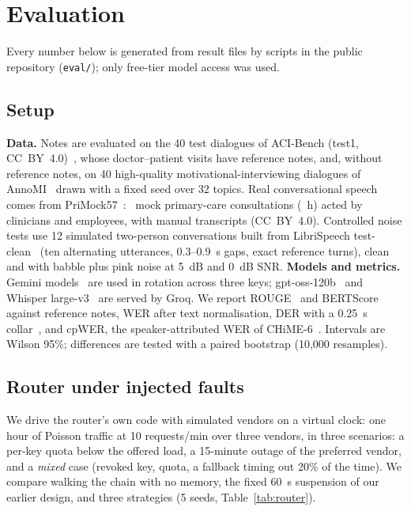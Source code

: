 \section{Evaluation}\label{sec:eval}
Every number below is generated from result files by scripts in the public repository (\texttt{eval/}); only free-tier model access was used.

\subsection{Setup}
\textbf{Data.} Notes are evaluated on the 40 test dialogues of ACI-Bench (test1, CC~BY~4.0)~\cite{yim2023aci}, whose doctor--patient visits have reference notes, and, without reference notes, on 40 high-quality motivational-interviewing dialogues of AnnoMI~\cite{wu2022annomi} drawn with a fixed seed over 32 topics. Real conversational speech comes from PriMock57~\cite{korfiatis2022primock57}: \ResPmN\ mock primary-care consultations (\ResPmHours~h) acted by clinicians and employees, with manual transcripts (CC~BY~4.0). Controlled noise tests use 12 simulated two-person conversations built from LibriSpeech test-clean~\cite{panayotov2015librispeech} (ten alternating utterances, 0.3--0.9~s gaps, exact reference turns), clean and with babble plus pink noise at 5~dB and 0~dB SNR.
\textbf{Models and metrics.} Gemini models~\cite{gemini2023} are used in rotation across three keys; gpt-oss-120b~\cite{openai2025gptoss} and Whisper large-v3~\cite{radford2023whisper} are served by Groq. We report ROUGE~\cite{lin2004rouge} and BERTScore~\cite{zhang2020bertscore} against reference notes, WER after text normalisation, DER with a 0.25~s collar~\cite{bredin2017metrics}, and cpWER, the speaker-attributed WER of CHiME-6~\cite{watanabe2020chime6}. Intervals are Wilson 95\%; differences are tested with a paired bootstrap (10{,}000 resamples).

\subsection{Router under injected faults}
We drive the router's own code with simulated vendors on a virtual clock: one hour of Poisson traffic at 10 requests/min over three vendors, in three scenarios: a per-key quota below the offered load, a 15-minute outage of the preferred vendor, and a \emph{mixed} case (revoked key, quota, a fallback timing out 20\% of the time). We compare walking the chain with no memory, the fixed 60~s suspension of our earlier design, and three strategies (5 seeds, Table~\ref{tab:router}).

